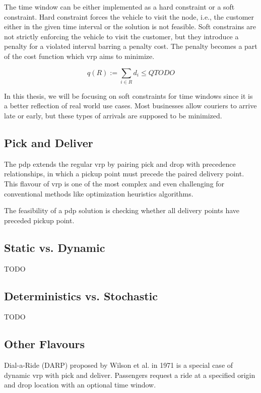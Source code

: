     The time window can be either implemented as a hard constraint or a soft constraint. Hard constraint forces the vehicle to visit the node, i.e., the customer either in the given time interval or the solution is not feasible. Soft constrains are not strictly enforcing the vehicle to visit the customer, but they introduce a penalty for a violated interval barring a penalty cost. The penalty becomes a part of the cost function which \gls{vrp} aims to minimize.
    
    \begin{equation}
        q(R) := \sum_{i \in R} d_i \leq Q TODO
    \end{equation}
    
    In this thesis, we will be focusing on soft constraints for time windows since it is a better reflection of real world use cases. Most businesses allow couriers to arrive late or early, but these types of arrivals are supposed to be minimized.
    
    \subsection{Pick and Deliver}
    The \gls{pdp} extends the regular \gls{vrp} by pairing pick and drop with precedence relationships, in which a pickup point must precede the paired delivery point. This flavour of \gls{vrp} is one of the most complex and even challenging for conventional methods like optimization heuristics algorithms.
    
    The feasibility of a \gls{pdp} solution is checking whether all delivery points have preceded pickup point.
    
    \subsection{Static vs. Dynamic}
    TODO
    \subsection{Deterministics vs. Stochastic}
    TODO
    
    \subsection{Other Flavours}
    Dial-a-Ride (DARP) proposed by Wilson et al. \cite{darp-proposed} in 1971 is a special case of dynamic \gls{vrp} with pick and deliver. Passengers request a ride at a specified origin and drop location with an optional time window. 
    
